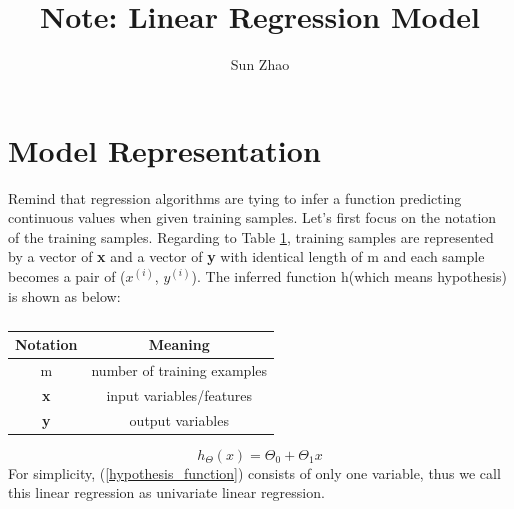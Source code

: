\documentclass{article}
\title{Note: Linear Regression Model}
\author{Sun Zhao}
\begin{document}
\maketitle
\newpage

\section{Model Representation}
Remind that regression algorithms are tying to infer a function predicting continuous values when given training samples. Let's first focus on the notation of the training samples. Regarding to Table \ref{example_notation}, training samples are represented by a vector of \textbf{x} and a vector of \textbf{y} with identical length of m and each sample becomes a pair of ($x^{(i)}$, $y^{(i)}$). The inferred function h(which means hypothesis) is shown as below:\\
\begin{table}[ht]
\begin{center}
\caption{}\label{example_notation}
\begin{tabular}{c|c}
\hline
Notation & Meaning\\
\hline
m &  number of training examples\\
\hline
\textbf{x} & input variables/features\\
\hline
\textbf{y} & output variables\\
\hline
\end{tabular}
\end{center}
\end{table}

\begin{equation}\label{hypothesis_function}
  h_\Theta(x)=\Theta_0 + \Theta_1x
\end{equation}
For simplicity, (\ref{hypothesis_function}) consists of only one variable, thus we call this linear regression as univariate linear regression.
\end{document}
